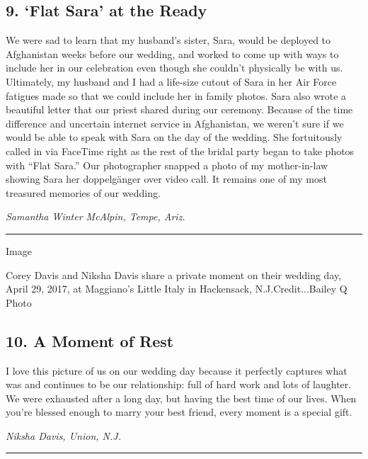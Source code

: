 \hypertarget{9-flat-sara-at-the-ready}{%
\subsection{9. `Flat Sara' at the
Ready}\label{9-flat-sara-at-the-ready}}

We were sad to learn that my husband's sister, Sara, would be deployed
to Afghanistan weeks before our wedding, and worked to come up with ways
to include her in our celebration even though she couldn't physically be
with us. Ultimately, my husband and I had a life-size cutout of Sara in
her Air Force fatigues made so that we could include her in family
photos. Sara also wrote a beautiful letter that our priest shared during
our ceremony. Because of the time difference and uncertain internet
service in Afghanistan, we weren't sure if we would be able to speak
with Sara on the day of the wedding. She fortuitously called in via
FaceTime right as the rest of the bridal party began to take photos with
``Flat Sara.'' Our photographer snapped a photo of my mother-in-law
showing Sara her doppelgänger over video call. It remains one of my most
treasured memories of our wedding.

\emph{Samantha Winter McAlpin, Tempe, Ariz.}

\begin{center}\rule{0.5\linewidth}{\linethickness}\end{center}

Image

Corey Davis and Niksha Davis share a private moment on their wedding
day, April 29, 2017, at Maggiano's Little Italy in Hackensack,
N.J.Credit...Bailey Q Photo

\hypertarget{10-a-moment-of-rest}{%
\subsection{10. A Moment of Rest}\label{10-a-moment-of-rest}}

I love this picture of us on our wedding day because it perfectly
captures what was and continues to be our relationship: full of hard
work and lots of laughter. We were exhausted after a long day, but
having the best time of our lives. When you're blessed enough to marry
your best friend, every moment is a special gift.

\emph{Niksha Davis, Union, N.J.}

\begin{center}\rule{0.5\linewidth}{\linethickness}\end{center}

